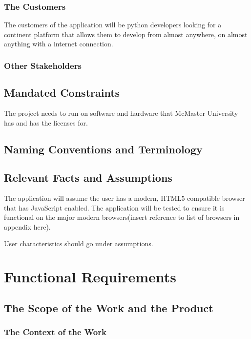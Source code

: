 \documentclass[12pt, titlepage]{article}
\begin{document}
    \subsubsection{The Customers}
    The customers of the application will be python developers looking for a
    continent platform that allows them to develop from almost anywhere, on
    almost anything with a internet connection.

    \subsubsection{Other Stakeholders}

  \subsection{Mandated Constraints}
  The project needs to run on software and hardware that McMaster University
  has and has the licenses for.

  \subsection{Naming Conventions and Terminology}

  \subsection{Relevant Facts and Assumptions}
  The application will assume the user has a modern, HTML5 compatible browser
  that has JavaScript enabled. The application will be tested to ensure it is
  functional on the major modern browsers(insert reference to list of browsers
  in appendix here).

  User characteristics should go under assumptions.

\section{Functional Requirements}

  \subsection{The Scope of the Work and the Product}

    \subsubsection{The Context of the Work}
\end{document}
